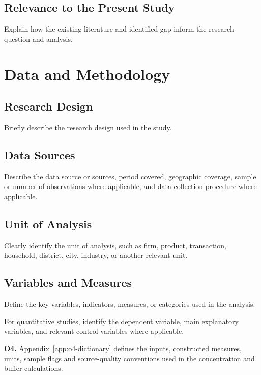 \documentclass[12pt,a4paper]{article}
\begin{document}
\subsection{Relevance to the Present Study}
Explain how the existing literature and identified gap inform the research question and analysis.

\section{Data and Methodology}
\subsection{Research Design}
Briefly describe the research design used in the study.

\subsection{Data Sources}
Describe the data source or sources, period covered, geographic coverage, sample or number of observations where applicable, and data collection procedure where applicable.

\subsection{Unit of Analysis}
Clearly identify the unit of analysis, such as firm, product, transaction, household, district, city, industry, or another relevant unit.

\subsection{Variables and Measures}
Define the key variables, indicators, measures, or categories used in the analysis.

For quantitative studies, identify the dependent variable, main explanatory variables, and relevant control variables where applicable.

\textbf{O4.} Appendix~\ref{app:o4-dictionary} defines the inputs, constructed measures, units, sample flags and source-quality conventions used in the concentration and buffer calculations.

\clearpage
\end{document}
